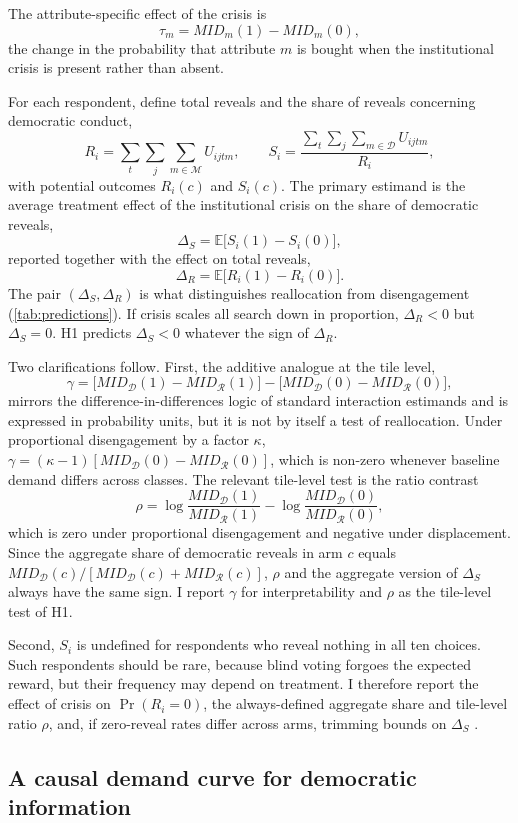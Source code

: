 \documentclass[11pt]{article}
\newcommand{\MID}{\mathit{MID}}
\newcommand{\E}{\mathbb{E}}
\newcommand{\Dem}{\mathcal{D}}
\newcommand{\Res}{\mathcal{R}}
\begin{document}
The attribute-specific effect of the crisis is
\[
\tau_m=\MID_m(1)-\MID_m(0),
\]
the change in the probability that attribute $m$ is bought when the institutional crisis is present rather than absent.

For each respondent, define total reveals and the share of reveals concerning democratic conduct,
\[
R_i=\sum_{t}\sum_{j}\sum_{m\in\mathcal{M}}U_{ijtm},
\qquad
S_i=\frac{\sum_{t}\sum_{j}\sum_{m\in\Dem}U_{ijtm}}{R_i},
\]
with potential outcomes $R_i(c)$ and $S_i(c)$. The primary estimand is the average treatment effect of the institutional crisis on the share of democratic reveals,
\[
\Delta_S=\E\bigl[S_i(1)-S_i(0)\bigr],
\]
reported together with the effect on total reveals,
\[
\Delta_R=\E\bigl[R_i(1)-R_i(0)\bigr].
\]
The pair $(\Delta_S,\Delta_R)$ is what distinguishes reallocation from disengagement (\cref{tab:predictions}). If crisis scales all search down in proportion, $\Delta_R<0$ but $\Delta_S=0$. H1 predicts $\Delta_S<0$ whatever the sign of $\Delta_R$.

Two clarifications follow. First, the additive analogue at the tile level,
\[
\gamma=\bigl[\MID_{\Dem}(1)-\MID_{\Res}(1)\bigr]-\bigl[\MID_{\Dem}(0)-\MID_{\Res}(0)\bigr],
\]
mirrors the difference-in-differences logic of standard interaction estimands and is expressed in probability units, but it is not by itself a test of reallocation. Under proportional disengagement by a factor $\kappa$, $\gamma=(\kappa-1)[\MID_{\Dem}(0)-\MID_{\Res}(0)]$, which is non-zero whenever baseline demand differs across classes. The relevant tile-level test is the ratio contrast
\[
\rho=\log\frac{\MID_{\Dem}(1)}{\MID_{\Res}(1)}-\log\frac{\MID_{\Dem}(0)}{\MID_{\Res}(0)},
\]
which is zero under proportional disengagement and negative under displacement. Since the aggregate share of democratic reveals in arm $c$ equals $\MID_{\Dem}(c)/[\MID_{\Dem}(c)+\MID_{\Res}(c)]$, $\rho$ and the aggregate version of $\Delta_S$ always have the same sign. I report $\gamma$ for interpretability and $\rho$ as the tile-level test of H1.

Second, $S_i$ is undefined for respondents who reveal nothing in all ten choices. Such respondents should be rare, because blind voting forgoes the expected reward, but their frequency may depend on treatment. I therefore report the effect of crisis on $\Pr(R_i=0)$, the always-defined aggregate share and tile-level ratio $\rho$, and, if zero-reveal rates differ across arms, trimming bounds on $\Delta_S$ \parencite{Lee2009bounds}.

\subsection{A causal demand curve for democratic information}
\end{document}
